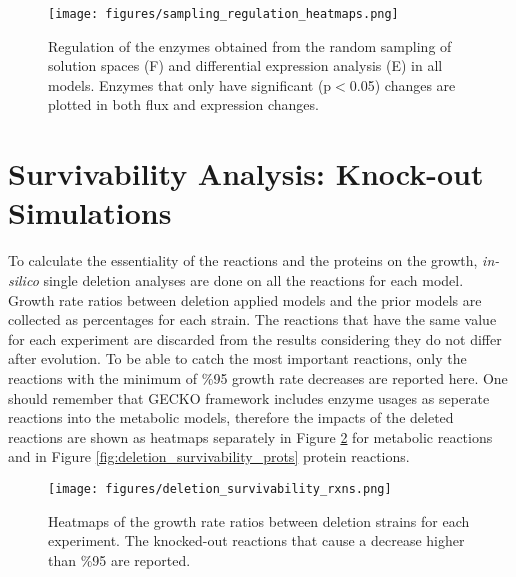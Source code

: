 \begin{figure}[H]
  \begin{center}
  \texttt{[image: figures/sampling\_regulation\_heatmaps.png]}
  \caption[Regulation of the enzymes obtained from the random sampling of solution spaces (F) and differential expression analysis (E) in all models. Enzymes that only have significant (p$<$0.05) changes are plotted in both flux and expression changes]{Regulation of the enzymes obtained from the random sampling of solution spaces (F) and differential expression analysis (E) in all models. Enzymes that only have significant (p$<$0.05) changes are plotted in both flux and expression changes. }
  \label{fig:sampling_regulation_heatmaps}
  \end{center}
\end{figure}


\section{Survivability Analysis: Knock-out Simulations}
To calculate the essentiality of the reactions and the proteins on the growth, \emph{in-silico} single deletion analyses are done on all the reactions for each model. Growth rate ratios between deletion applied models and the prior models are collected as percentages for each strain. The reactions that have the same value for each experiment are discarded from the results considering they do not differ after evolution. To be able to catch the most important reactions, only the reactions with the minimum of \%95 growth rate decreases are reported here. One should remember that GECKO framework includes enzyme usages as seperate reactions into the metabolic models, therefore the impacts of the deleted reactions are shown as heatmaps separately in Figure \ref{fig:deletion_survivability_rxns} for metabolic reactions and in Figure \ref{fig:deletion_survivability_prots} protein reactions.

\begin{figure}[H]
  \begin{center}
  \texttt{[image: figures/deletion\_survivability\_rxns.png]}
  \caption[Heatmaps of the growth rate ratios between deletion strains for each experiment. The knocked-out reactions that cause a decrease higher than \%95 are reported.]{Heatmaps of the growth rate ratios between deletion strains for each experiment. The knocked-out reactions that cause a decrease higher than \%95 are reported.}
  \label{fig:deletion_survivability_rxns}
  \end{center}
\end{figure}

